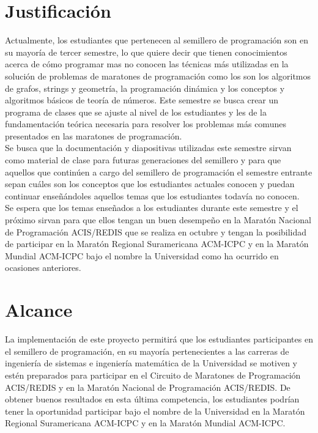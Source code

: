 \documentclass[11pt, oneside]{article}
\theoremstyle{definition}
\theoremstyle{remark}
\begin{document}
\section{Justificación}
Actualmente, los estudiantes que pertenecen al semillero de programación son en su mayoría de tercer semestre, lo que quiere decir que tienen conocimientos acerca de cómo programar mas no conocen las técnicas más utilizadas en la solución de problemas de maratones de programación como los son los algoritmos de grafos, strings y geometría, la programación dinámica y los conceptos y algoritmos básicos de teoría de números. Este semestre se busca crear un programa de clases que se ajuste al nivel de los estudiantes y les de la fundamentación teórica necesaria para resolver los problemas más comunes presentados en las maratones de programación.\\
Se busca que la documentación y diapositivas utilizadas este semestre sirvan como material de clase para futuras generaciones del semillero y para que aquellos que continúen a cargo del semillero de programación el semestre entrante sepan cuáles son los conceptos que los estudiantes actuales conocen y puedan continuar enseñándoles aquellos temas que los estudiantes todavía no conocen.\\
Se espera que los temas enseñados a los estudiantes durante este semestre y el próximo sirvan para que ellos tengan un buen desempeño en la Maratón Nacional de Programación ACIS/REDIS que se realiza en octubre y tengan la posibilidad de participar en la Maratón Regional Suramericana ACM-ICPC y en la Maratón Mundial ACM-ICPC bajo el nombre la Universidad como ha ocurrido en ocasiones anteriores.

\section{Alcance}
La implementación de este proyecto permitirá que los estudiantes participantes en el semillero de programación, en su mayoría pertenecientes a las carreras de ingeniería de sistemas e ingeniería matemática de la Universidad se motiven y estén preparados para participar en el Circuito de Maratones de Programación ACIS/REDIS y en la Maratón Nacional de Programación ACIS/REDIS. De obtener buenos resultados en esta última competencia, los estudiantes podrían tener la oportunidad participar bajo el nombre de la Universidad en la Maratón Regional Suramericana ACM-ICPC y en la Maratón Mundial ACM-ICPC.
\end{document}
